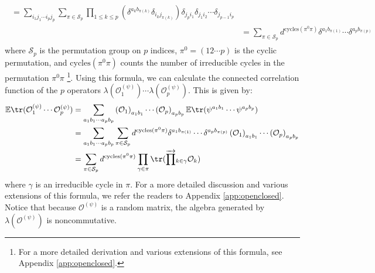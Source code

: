 \documentclass[a4paper,11pt]{article}
\theoremstyle{definition}
\numberwithin{equation}{section}
\newcommand{\lb}{\left(}
\newcommand{\rb}{\right)}
\begin{document}
\begin{enumerate}
\begin{align}
\begin{split}
            =\sum_{i_1j_1\cdots i_pj_p}\sum_{\pi\in\mathcal{S}_p}\prod_{1\leq k\leq p}\lb\delta^{a_k b_{\pi(k)}}\delta_{i_kj_{\pi(k)}}\rb\delta_{j_pi_1}\delta_{j_1i_2}\cdots\delta_{j_{p-1}i_p}
            \\&
            =\sum_{\pi\in\mathcal{S}_p}d^{\text{cycles}(\pi^0\pi)}\delta^{a_1b_{\pi(1)}}\cdots\delta^{a_pb_{\pi(p)}}
        \end{split}
    \end{align}
    where $\mathcal{S}_p$ is the permutation group on $p$ indices, $\pi^0 = (12\cdots p)$ is the cyclic permutation, and $\text{cycles}(\pi^0\pi)$ counts the number of irreducible cycles in the permutation $\pi^0\pi$ \footnote{For a more detailed derivation and various extensions of this formula, see Appendix \ref{app:openclosed}.}. Using this formula, we can calculate the connected correlation function of the $p$ operators $\lambda(\mathcal{O}_1^{(\psi)})\cdots\lambda(\mathcal{O}_p^{(\psi)})$. This is given by:
    \begin{align}
        \begin{split}
            \mathbb{E}\tr(\mathcal{O}_1^{(\psi)}\cdots\mathcal{O}_p^{(\psi)}) &= \sum_{a_1b_1\cdots a_pb_p}\lb\mathcal{O}_1\rb_{a_1b_1}\cdots\lb\mathcal{O}_p\rb_{a_pb_p}\mathbb{E}\tr(\psi^{a_1b_1}\cdots\psi^{a_pb_p})
            \\&
            =\sum_{a_1b_1\cdots a_pb_p}\sum_{\pi\in\mathcal{S}_p}d^{\text{cycles}(\pi^0\pi)}\delta^{a_1b_{\pi(1)}}\cdots\delta^{a_pb_{\pi(p)}}\lb\mathcal{O}_1\rb_{a_1b_1}\cdots\lb\mathcal{O}_p\rb_{a_pb_p}
            \\&
            =\sum_{\pi\in\mathcal{S}_p}d^{\text{cycles}(\pi^0\pi)}\prod_{\gamma\in\pi}\tr(\overrightarrow{\prod}_{k\in\gamma}\mathcal{O}_k)
        \end{split}
    \end{align}
    where $\gamma$ is an irreducible cycle in $\pi$. For a more detailed discussion and various extensions of this formula, we refer the readers to Appendix \ref{app:openclosed}. Notice that because $\mathcal{O}^{(\psi)}$ is a random matrix, the algebra generated by $\lambda(\mathcal{O}^{(\psi)})$ is noncommutative.


\end{enumerate}
\end{document}
